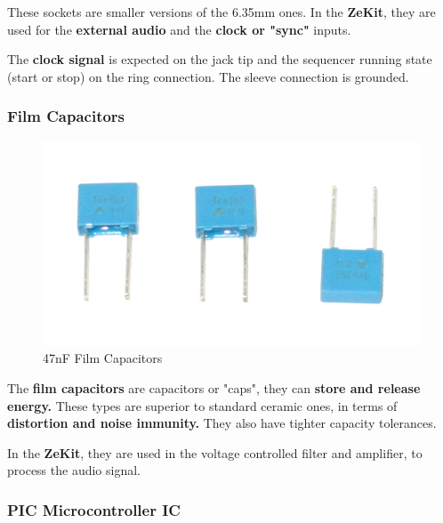 \documentclass{scrartcl}
\begin{document}
These sockets are smaller versions of the 6.35mm ones. In the \textbf{ZeKit}, they are used for the \textbf{external audio} and the \textbf{clock or "sync"} inputs.

The \textbf{clock signal} is expected on the jack tip and the sequencer running state (start or stop) on the ring connection. The sleeve connection is grounded.

\subsubsection{Film Capacitors}

\begin{figure}[!ht]
    \begin{center}
        \includegraphics[scale=0.15]{assets/zekit-caps.jpg}
        \caption{47nF Film Capacitors}
    \end{center}
\end{figure}

The \textbf{film capacitors} are capacitors or "caps", they can \textbf{store and release energy.} These types are superior to standard ceramic ones, in terms of \textbf{distortion and noise immunity.}
They also have tighter capacity tolerances.

In the \textbf{ZeKit}, they are used in the voltage controlled filter and amplifier, to process the audio signal.

\pagebreak
\subsubsection{PIC Microcontroller IC}
\end{document}
